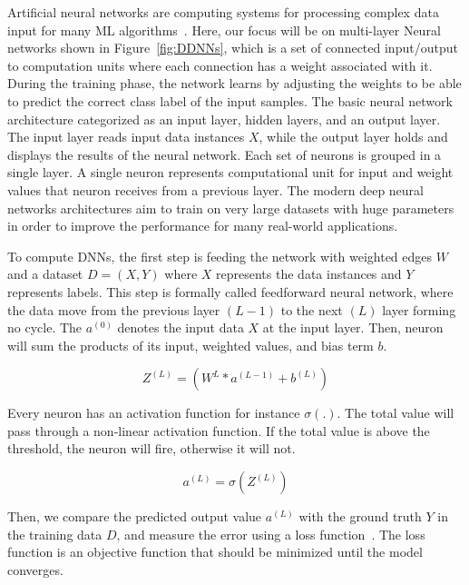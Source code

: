 \documentclass[conference]{IEEEtran}
\begin{document}
Artificial neural networks are computing systems for processing complex data input for many ML algorithms~\cite{wiki:ANN}. Here, our focus will be on multi-layer Neural networks shown in Figure~\ref{fig:DDNNs}, which is a set of connected input/output to computation units where each connection has a weight associated with it. During the training phase, the network learns by adjusting the weights to be able to predict the correct class label of the input samples. The basic neural network architecture categorized as an input layer, hidden layers, and an output layer. The input layer reads input data instances $X$, while the output layer holds and displays the results of the neural network. Each set of neurons is grouped in a single layer. A single neuron represents computational unit for input and weight values that neuron receives from a previous layer. The modern deep neural networks architectures aim to train on very large datasets with huge parameters in order to improve the performance for many real-world applications.

To compute DNNs, the first step is feeding the network with weighted edges $W$ and a dataset $D=(X,Y) $ where $X$ represents the data instances and $Y$ represents labels. This step is formally called feedforward neural network, where the data move from the previous layer $(L-1)$ to the next $(L)$ layer forming no cycle. The $a^{(0)}$ denotes the input data $X$ at the input layer. Then, neuron will sum the products of its input, weighted values, and bias term $b$. 

\begin{equation}
Z^{(L)} = ( W^ {L} * a^{(L-1)} +b^{(L)})
\end{equation}

Every neuron has an activation function for instance $\sigma(.)$. The total value will pass through a non-linear activation function. If the total value is above the threshold, the neuron will fire, otherwise it will not. 

\begin{equation}
a^{(L)} = \sigma(Z^{(L)})
\end{equation}

Then, we compare the predicted output value $a^{(L)}$ with the ground truth $Y$ in the training data $D$, and measure the error using a loss function~\cite{Loss}. The loss function is an objective function that should be minimized until the model converges.
\end{document}
